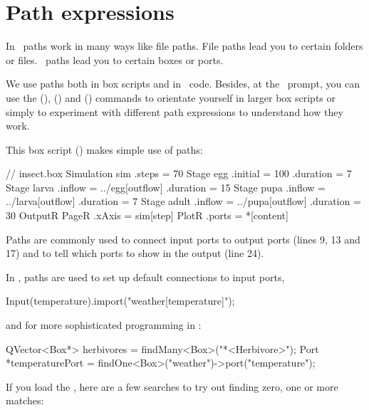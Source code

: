 \section{Path expressions}
In \US\ paths work in many ways like file paths. File paths lead you to certain folders or files. \US\ paths lead you to certain boxes or ports.

We use paths both in box scripts and in \CPP\ code. Besides, at the \US\ prompt, you can use the  (),  () and  () commands to orientate yourself in larger box scripts or simply to experiment with different path expressions to understand how they work.

This box script () makes simple use of paths:

\lstset{numbers=left}
\begin{boxscript}
// insect.box
Simulation sim {
  .steps = 70
  Stage egg {
    .initial = 100 
    .duration = 7
  }
  Stage larva {
    .inflow = ../egg[outflow]
    .duration = 15
  }
  Stage pupa {
    .inflow = ../larva[outflow]
    .duration = 7
  }
  Stage adult {
    .inflow = ../pupa[outflow]
    .duration = 30
  }
  OutputR {
    PageR {
      .xAxis = sim[step]
      PlotR {
        .ports = *[content]
      }
    }
  }
}
\end{boxscript}
\lstset{numbers=none}

Paths are commonly used to connect input ports to output ports (lines 9, 13 and 17) and to tell which ports to show in the output (line 24).

In \CPP, paths are used to set up default connections to input ports,
\begin{cpp}
Input(temperature).import("weather[temperature]");
\end{cpp}

\noindent
and for more sophisticated programming in \CPP:
\begin{cpp}
QVector<Box*> herbivores = 
  findMany<Box>("*<Herbivore>");
Port *temperaturePort = 
  findOne<Box>("weather")->port("temperature");
\end{cpp}

If you load the , here are a few searches to try out finding zero, one or more matches:

